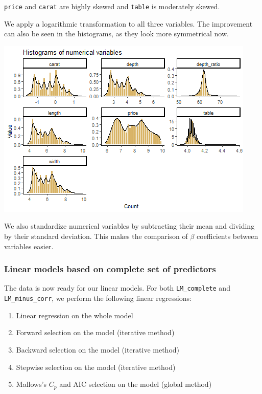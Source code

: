 \documentclass[
  paper=a4,
  ,captions=tableheading
]{scrartcl}
\providecommand{\tightlist}{%
  \setlength{\itemsep}{0pt}\setlength{\parskip}{0pt}}
\begin{document}
\texttt{price} and \texttt{carat} are highly skewed and \texttt{table}
is moderately skewed.

We apply a logarithmic transformation to all three variables. The
improvement can also be seen in the histograms, as they look more
symmetrical now.

\begin{center}\includegraphics{Diamonds_PDF_files/figure-latex/hist-unskewed-1} \end{center}

We also standardize numerical variables by subtracting their mean and
dividing by their standard deviation. This makes the comparison of
\(\beta\) coefficients between variables easier.

\hypertarget{linear-models-based-on-complete-set-of-predictors}{%
\subsubsection{Linear models based on complete set of
predictors}\label{linear-models-based-on-complete-set-of-predictors}}

The data is now ready for our linear models. For both
\texttt{LM\_complete} and \texttt{LM\_minus\_corr}, we perform the
following linear regressions:

\begin{enumerate}
\def\labelenumi{\arabic{enumi}.}
\tightlist
\item
  Linear regression on the whole model
\item
  Forward selection on the model (iterative method)
\item
  Backward selection on the model (iterative method)
\item
  Stepwise selection on the model (iterative method)
\item
  Mallows's \(C_p\) and AIC selection on the model (global method)
\end{enumerate}
\end{document}
